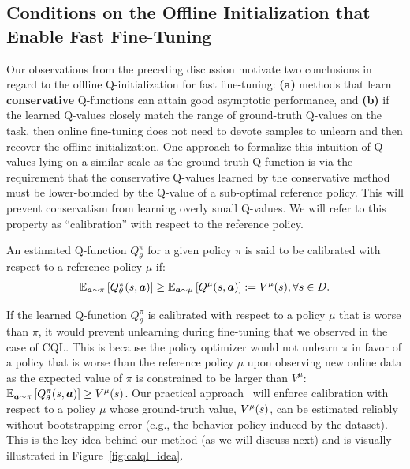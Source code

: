\vspace{-0.2cm}
\subsection{Conditions on the Offline Initialization that Enable Fast Fine-Tuning}
\vspace{-0.2cm}
Our observations from the preceding discussion motivate two conclusions in regard to the offline Q-initialization for fast fine-tuning: \textbf{(a)} methods that learn \textbf{conservative} Q-functions can attain good asymptotic performance, and \textbf{(b)} if the learned Q-values closely match the range of ground-truth Q-values on the task, then online fine-tuning does not need to devote samples to unlearn and then recover the offline initialization. One approach to formalize this intuition of Q-values lying on a similar scale as the ground-truth Q-function is via the requirement that the conservative Q-values learned by the conservative method must be lower-bounded by the Q-value of a sub-optimal reference policy. This will prevent conservatism from learning overly small Q-values. We will refer to this property as ``calibration'' with respect to the reference policy.
\begin{tcolorbox}[colback=blue!6!white,colframe=black,boxsep=0pt,top=-3pt,bottom=2pt]
\vspace{2mm}
\begin{definition}[Calibration]
\label{cond:calibration}
An estimated Q-function ${Q}_\theta^\pi$ for a given policy $\pi$ is said to be calibrated with respect to a reference policy $\mu$ if:
\begin{align} 
    \mathbb{E}_{\boldsymbol{a} \sim \pi}\left[Q_\theta^\pi(s, \boldsymbol{a})\right] \geq \mathbb{E}_{\boldsymbol{a} \sim \mu}\left[Q^\mu(s, \boldsymbol{a})\right] := V^\mu(s), \forall s \in \mathcal \mathcal{D}.
\end{align}
\end{definition}
\end{tcolorbox}

If the learned Q-function ${Q}^\pi_\theta$ is calibrated with respect to a policy $\mu$ that is worse than $\pi$, it would prevent unlearning during fine-tuning that we observed in the case of CQL.
This is because the policy optimizer would not unlearn $\pi$ in favor of a policy that is worse than the reference policy $\mu$ upon observing new online data as the expected value of $\pi$ is constrained to be larger than $V^\mu$: $\mathbb{E}_{\boldsymbol{a} \sim \pi}\left[{Q}^\pi_\theta(s, \boldsymbol{a})\right] \geq V^\mu(s)$.
Our practical approach \methodname\ will enforce calibration with respect to a policy $\mu$ whose ground-truth value, $V^\mu(s)$, can be estimated reliably without bootstrapping error (e.g., the behavior policy induced by the dataset). This is the key idea behind our method (as we will discuss next) and is visually illustrated in Figure~\ref{fig:calql_idea}.

\vspace{-0.2cm}